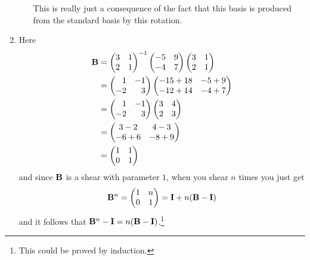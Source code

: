 \documentclass[fleqn,a4paper,11pt]{article}
\begin{document}
\begin{enumerate}[label=\textbf{\arabic*.}]
\begin{enumerate}[label=(\alph*)]
    This is really just a consequence of the fact that this basis is produced
    from the standard basis by this rotation.
  \end{enumerate}
 \item
  Here
  \begin{align*}
   \mat B
   &=
   \begin{pmatrix}
    3 & 1 \\
    2 & 1
   \end{pmatrix}^{-1}
   \begin{pmatrix}
    -5 & 9 \\
    -4 & 7
   \end{pmatrix}
   \begin{pmatrix}
    3 & 1 \\
    2 & 1
   \end{pmatrix} \\
   &=
   \begin{pmatrix*}[r]
    1 & -1 \\
    -2 & 3
   \end{pmatrix*}
   \begin{pmatrix}
   -15 + 18 & -5 + 9 \\
   -12 + 14 & -4 + 7
   \end{pmatrix} \\
   &=
   \begin{pmatrix*}[r]
    1 & -1 \\
    -2 & 3
   \end{pmatrix*}
   \begin{pmatrix}
   3 & 4 \\
   2 & 3
   \end{pmatrix} \\
   &=
   \begin{pmatrix}
    3 - 2 & 4 - 3 \\
    -6 + 6 & -8 + 9
   \end{pmatrix} \\
   &=
   \begin{pmatrix}
    1 & 1 \\
    0 & 1
   \end{pmatrix}
  \end{align*}
  and since \(\mathbf{B}\) is a shear with parameter \(1\), when you shear \(n\)
  times you just get
  \begin{equation*}
   \mathbf{B}^n =
   \begin{pmatrix}
    1 & n \\
    0 & 1
   \end{pmatrix}
   = \mathbf{I} + n(\mathbf{B} - \mathbf{I})
  \end{equation*}
  and it follows that \(\mathbf{B}^n - \mathbf{I} = n(\mathbf{B} - \mathbf{I})\).\footnote{
   This could be proved by induction.}


\end{enumerate}
\end{document}
